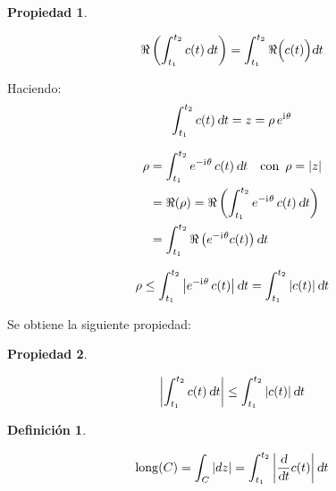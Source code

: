 \documentclass[a5paper,12pt,twoside]{book}
\newtheorem{defn}{{Definición}}[chapter]
\newtheorem{prop}{{Propiedad}}[chapter]
\begin{document}
\begin{mdframed}[style=MyFrame1]
    \begin{prop}
    \end{prop}
    \begin{equation*}
        \Re \left( \int_{t_1}^{t_2} c(t) \, \textsl{d} t \right) = \int_{t_1}^{t_2} \Re \Big( c(t) \Big) \textsl{d} t
    \end{equation*}
\end{mdframed}

Haciendo:
\begin{equation*}
    \int_{t_1}^{t_2} c(t) \, \textsl{d} t = z = \rho \, e^{\mathrm{i}\mkern1mu \theta}
\end{equation*}

\begin{align*}
    \rho &= \int_{t_1}^{t_2} e^{-\mathrm{i}\mkern1mu \theta} \, c(t) \, \textsl{d} t \quad \textrm{con} \enspace \rho = {\left| {z} \right|}
    \\
    &= \Re (\rho) = \Re \left( \int_{t_1}^{t_2} e^{-\mathrm{i}\mkern1mu \theta} \, c(t) \, \textsl{d} t \right)
    \\
    &= \int_{t_1}^{t_2} \Re \left( e^{-\mathrm{i}\mkern1mu \theta} c(t) \right) \textsl{d} t 
\end{align*}

\begin{equation*}
    \rho \leq \int_{t_1}^{t_2} {\left| {e^{-\mathrm{i}\mkern1mu \theta} \, c(t)} \right|} \, \textsl{d} t = \int_{t_1}^{t_2} {\left| {c(t)} \right|} \, \textsl{d} t
\end{equation*}

Se obtiene la siguiente propiedad:

\begin{mdframed}[style=MyFrame1]
    \begin{prop}
    \end{prop}
    \begin{equation*}
        {\left| {\int_{t_1}^{t_2} c(t) \, \textsl{d}t} \right|} \leq \int_{t_1}^{t_2} {\left| {c(t)} \right|} \, \textsl{d} t
    \end{equation*}
\end{mdframed}

\begin{mdframed}[style=MyFrame1]
    \begin{defn}
    \end{defn}
    \begin{equation*}
        \operatorname{long} (C) = \int_C {\left| {dz} \right|} = \int_{t_1}^{t_2} {\left| {\frac{\textsl{d}}{\textsl{d} t} c(t)} \right|} \, \textsl{d} t
    \end{equation*}
\end{mdframed}
\end{document}

